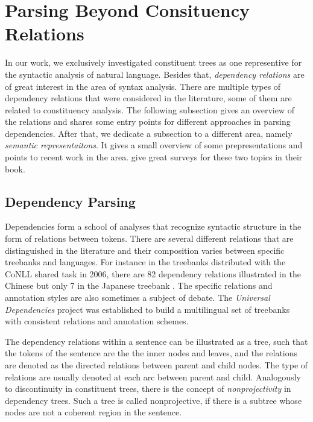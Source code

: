 \documentclass[../document.tex]{subfiles}
\begin{document}
    \section{Parsing Beyond Consituency Relations}\label{sec:literature:beyond}
    In our work, we exclusively investigated constituent trees as one representive for the syntactic analysis of natural language.
    Besides that, \emph{dependency relations} are of great interest in the area of syntax analysis.
    There are multiple types of dependency relations that were considered in the literature, some of them are related to constituency analysis.
    The following subsection gives an overview of the relations and shares some entry points for different approaches in parsing dependencies.
    After that, we dedicate a subsection to a different area, namely \emph{semantic representaitons}.
    It gives a small overview of some prepresentations and points to recent work in the area.
    \citet[Sections 18 and 19]{Jur23} give great surveys for these two topics in their book.

    \subsection{Dependency Parsing}
    Dependencies form a school of analyses that recognize syntactic structure in the form of relations between tokens.
    There are several different relations that are distinguished in the literature \citep[Table 3 shows the list of dependency relations annotated in the Universal Dependencies treebanks]{de2021universal} and their composition varies between specific treebanks and languages.
    For instance in the treebanks distributed with the CoNLL shared task in 2006, there are 82 dependency relations illustrated in the Chinese but only 7 in the Japanese treebank \citep[Table 1]{buchholz2006conll}.
    The specific relations and annotation styles are also sometimes a subject of debate. \citep{Gerdes2016DependencyAC,Rehbein2017UniversalDA,osborne2019status}
    The \emph{Universal Dependencies} project \citep{de2021universal} was established to build a multilingual set of treebanks with consistent relations and annotation schemes.

    The dependency relations within a sentence can be illustrated as a tree, such that the tokens of the sentence are the the inner nodes and leaves, and the relations are denoted as the directed relations between parent and child nodes.
    The type of relations are usually denoted at each arc between parent and child.
    Analogously to discontinuity in constituent trees, there is the concept of \emph{nonprojectivity} in dependency trees.
    Such a tree is called nonprojective, if there is a subtree whose nodes are not a coherent region in the sentence.
\end{document}
